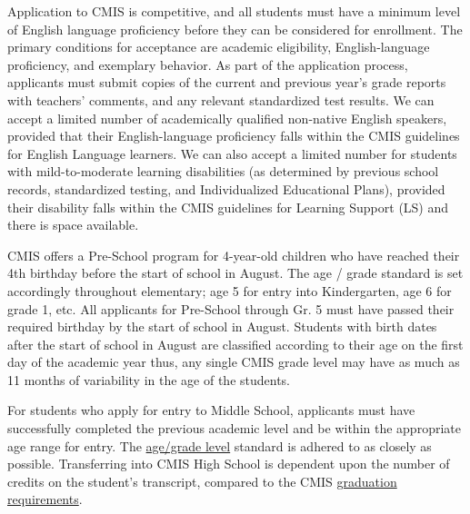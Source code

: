 

Application to CMIS is competitive, and all students must have a minimum level of English language proficiency before they can be considered for enrollment.  The primary conditions for acceptance are academic eligibility, English-language proficiency, and exemplary behavior.  As part of the application process, applicants must submit copies of the current and previous year’s grade reports with teachers' comments, and any relevant standardized test results.  We can accept a limited number of academically qualified non-native English speakers, provided that their English-language proficiency falls within the CMIS guidelines for English Language learners. We can also accept a limited number for students with mild-to-moderate learning disabilities (as determined by previous school records, standardized testing, and Individualized Educational Plans), provided their disability falls within the CMIS guidelines for Learning Support (LS) and there is space available.


CMIS offers a Pre-School program for 4-year-old children who have reached their 4th birthday before the start of school in August.  The age / grade standard is set accordingly throughout elementary; age 5 for entry into Kindergarten, age 6 for grade 1, etc.  All applicants for Pre-School through Gr. 5 must have passed their required birthday by the start of school in August.  Students with birth dates after the start of school in August are classified according to their age on the first day of the academic year thus, any single CMIS grade level may have as much as 11 months of variability in the age of the students.  

For students who apply for entry to Middle School, applicants must have successfully completed the previous academic level and be within the appropriate age range for entry.  The \href{http://cmis.ac.th/admissions}{age/grade level} standard is adhered to as closely as possible.  Transferring into CMIS High School is dependent upon the number of credits on the student's transcript, compared to the CMIS \href{http://cmis.ac.th/programs/high_school}{graduation requirements}.

